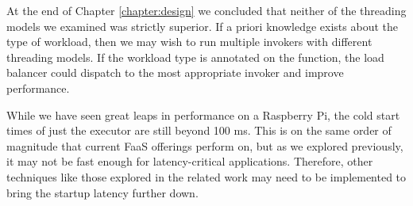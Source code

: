 At the end of Chapter \ref{chapter:design} we concluded that neither of the threading models we examined was strictly superior. If a priori knowledge exists about the type of workload, then we may wish to run multiple invokers with different threading models. If the workload type is annotated on the function, the load balancer could dispatch to the most appropriate invoker and improve performance.

While we have seen great leaps in performance on a Raspberry Pi, the cold start times of just the executor are still beyond 100 ms. This is on the same order of magnitude that current FaaS offerings perform on, but as we explored previously, it may not be fast enough for latency-critical applications. Therefore, other techniques like those explored in the related work may need to be implemented to bring the startup latency further down.

